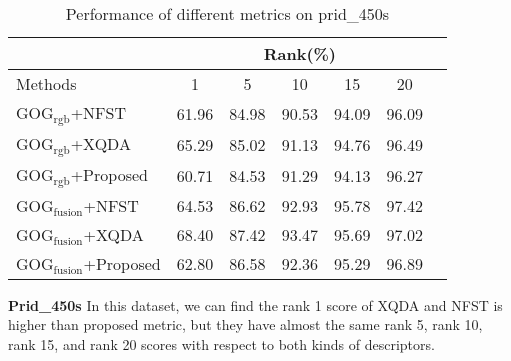 \documentclass[conference,compsoc]{IEEEtran}
\begin{document}
\begin{table}[H]
\caption{Performance of different metrics on prid\_450s}
\centering
\begin{tabular}{|l|c|c|c|c|c|c|}
\hline
& \multicolumn{5}{|c|}{Rank(\%)} \\
\hline
Methods& 1 & 5 &10& 15&20\\
\hline
GOG$_\text{rgb}$+NFST& 61.96&84.98 &90.53& 94.09&96.09 \\  %
\hline
GOG$_\text{rgb}$+XQDA&65.29 &85.02 & 91.13&94.76& 96.49\\ 
\hline
GOG$_\text{rgb}$+Proposed&60.71&84.53&91.29&94.13&96.27\\  %
\hline
GOG$_\text{fusion}$+NFST& 64.53&86.62 & 92.93&95.78&97.42 \\ 
\hline
GOG$_\text{fusion}$+XQDA&68.40 & 87.42&93.47 &95.69& 97.02\\ 
\hline
GOG$_\text{fusion}$+Proposed&62.80&86.58&92.36&95.29& 96.89\\ %

\hline

\end{tabular}
\end{table}
\textbf{Prid\_450s} In this dataset, we can find the rank 1 score of XQDA and NFST is higher than proposed metric, but they have almost the same rank 5, rank 10, rank 15, and rank 20 scores with respect to both kinds of descriptors. 
\end{document}
